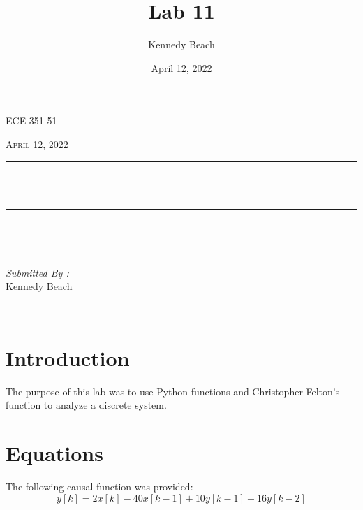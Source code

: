 \documentclass[12pt]{report}
\title{Lab 11}
\author{Kennedy Beach}
\date{April 12, 2022}
\makeatletter
\let\thetitle\@title
\makeatother
\begin{document}
\begin{titlepage}
\centering
\vspace*{0.5 cm}
\begin{center}    \textsc{\Large   ECE 351-51 }\\[2.0 cm]
\end{center}%
\textsc{\Large April 12, 2022}\\[0.5 cm] %
\rule{\linewidth}{0.2 mm} \\[0.4 cm]
{ \huge \bfseries \thetitle}\\
\rule{\linewidth}{0.2 mm} \\[1.5 cm]
\begin{minipage}{0.4\textwidth}
\begin{flushleft} \large
\end{flushleft}
\end{minipage}~
\begin{minipage}{0.4\textwidth}
\begin{flushright} \large
\emph{Submitted By :} \\
Kennedy Beach
\end{flushright}
\end{minipage}\\[2 cm]
\end{titlepage}
\tableofcontents
\pagebreak
\renewcommand{\thesection}{\arabic{section}}
\section{Introduction}
The purpose of this lab was to use Python functions and Christopher Felton's function to analyze a discrete system.
\section{Equations}

The following causal function was provided:
\begin{equation*}
y[k] = 2x[k] - 40x[k-1] + 10y[k-1] - 16y[k-2]
\end{equation*}
\end{document}
